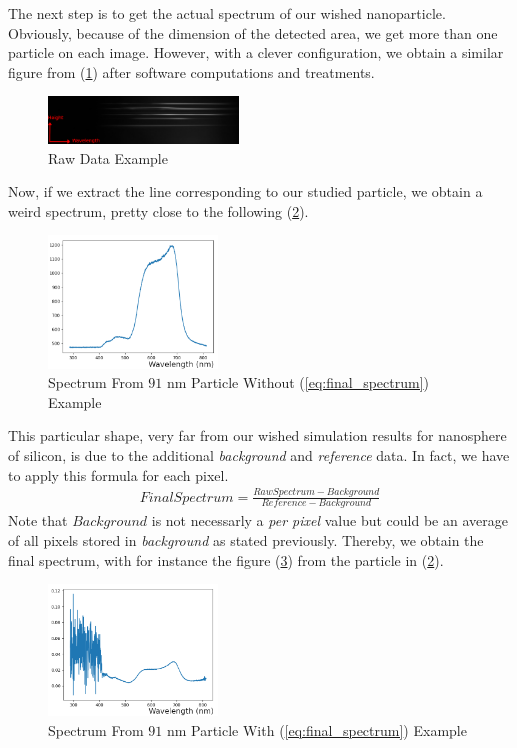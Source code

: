 \documentclass{article}
\numberwithin{equation}{section}
\begin{document}
The next step is to get the actual spectrum of our wished nanoparticle. Obviously, because of the dimension of the detected area, we get more than one particle on each image. However, with a clever configuration, we obtain a similar figure from (\ref{fig:raw_data_ex}) after software computations and treatments.
\begin{figure}[h!]
    \centering
    \includegraphics[width=0.45\textwidth, height=0.15\textwidth]{raw_data_ex.png}
    \caption{Raw Data Example}
    \label{fig:raw_data_ex}
\end{figure}
Now, if we extract the line corresponding to our studied particle, we obtain a weird spectrum, pretty close to the following (\ref{fig:spectrum_wout_calc_ex}).
\begin{figure}[h!]
    \centering
    \includegraphics[width=0.4\textwidth, height=0.35\textwidth]{spectrum_wout_calc_ex.png}
    \caption{Spectrum From $91$ nm Particle Without (\ref{eq:final_spectrum}) Example}
    \label{fig:spectrum_wout_calc_ex}
\end{figure}
This particular shape, very far from our wished simulation results for nanosphere of silicon, is due to the additional \textit{background} and \textit{reference} data. In fact, we have to apply this formula for each pixel.
\begin{align}\label{eq:final_spectrum}
FinalSpectrum = \frac{RawSpectrum - Background}{Reference - Background}
\end{align}
Note that $Background$ is not necessarly a \textit{per pixel} value but could be an average of all pixels stored in \textit{background} as stated previously. Thereby, we obtain the final spectrum, with for instance the figure (\ref{fig:spectrum_w_calc_ex}) from the particle in (\ref{fig:spectrum_wout_calc_ex}).
\begin{figure}[h!]
    \centering
    \includegraphics[width=0.4\textwidth, height=0.35\textwidth]{spectrum_w_calc_ex.png}
    \caption{Spectrum From $91$ nm Particle With (\ref{eq:final_spectrum}) Example}
    \label{fig:spectrum_w_calc_ex}
\end{figure}
\end{document}
